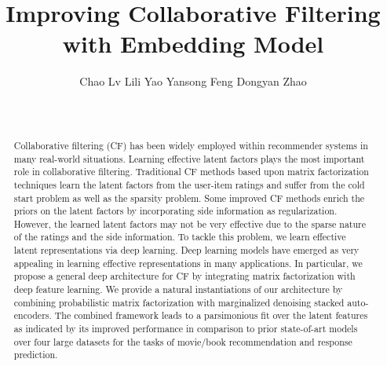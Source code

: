 \documentclass{sig-alternate-05-2015}
\begin{document}

\title{Improving Collaborative Filtering with Embedding Model}

\author{
\alignauthor
Chao Lv \quad
Lili Yao \quad
Yansong Feng \quad
Dongyan Zhao\\
\\
\\
}

\maketitle

\begin{abstract}
Collaborative filtering (CF) has been widely employed within recommender systems in many real-world situations.
Learning effective latent factors plays the most important role in collaborative filtering.
Traditional CF methods based upon matrix factorization techniques learn the latent factors from the user-item ratings and suffer from the cold start problem as well as the sparsity problem.
Some improved CF methods enrich the priors on the latent factors by incorporating side information as regularization.
However, the learned latent factors may not be very effective due to the sparse nature of the ratings and the side information.
To tackle this problem, we learn effective latent representations via deep learning.
Deep learning models have emerged as very appealing in learning effective representations in many applications.
In particular, we propose a general deep architecture for CF by integrating matrix factorization with deep feature learning.
We provide a natural instantiations of our architecture by combining probabilistic matrix factorization with marginalized denoising stacked auto-encoders.
The combined framework leads to a parsimonious fit over the latent features as indicated by its improved performance in comparison to prior state-of-art models over four large datasets for the tasks of movie/book recommendation and response prediction.
\end{abstract}

\end{document}
